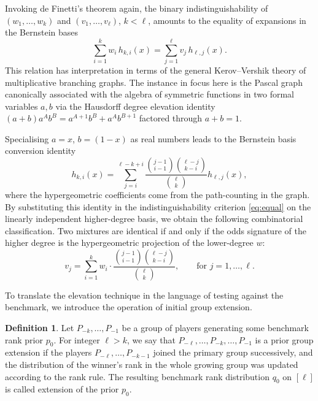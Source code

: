 \documentclass[11pt,reqno]{amsart}
\theoremstyle{definition}
\newtheorem{definition}[theorem]{Definition}
\theoremstyle{remark}
\numberwithin{equation}{section}
\begin{document}
Invoking de Finetti's theorem again, the binary indistinguishability of \((w_1,\dots,w_k)\) and \((v_1,\dots,v_\ell)\), \(k<\ell\), amounts to the equality of expansions in the Bernstein bases
\begin{equation}\label{eq:equal}
\sum_{i=1}^k w_i\,h_{k,i}(x)=\sum_{j=1}^\ell v_j\,h_{\ell,j}(x).
\end{equation}
This relation has interpretation in terms of the general Kerov--Vershik theory of multiplicative branching graphs. The instance \cite{VershikKerov1987} in focus here is the Pascal graph canonically associated with the algebra of symmetric functions in two formal variables \(a,b\) via the Hausdorff degree elevation identity \((a+b)a^Ab^B=a^{A+1}b^B+a^Ab^{B+1}\) factored through \(a+b=1\).

Specialising \(a=x\), \(b=(1-x)\) as real numbers leads to the Bernstein basis conversion identity
\begin{equation}\label{eq:Bernstein}
h_{k,i}(x)=\sum_{j=i}^{\ell-k+i}\frac{\binom{j-1}{i-1}\binom{\ell-j}{k-i}}{\binom{\ell}{k}}h_{\ell,j}(x),
\end{equation}
where the hypergeometric coefficients come from the path-counting in the graph. By substituting this identity in the indistinguishability criterion \eqref{eq:equal} on the linearly independent higher-degree basis, we obtain the following combinatorial classification. Two mixtures are identical if and only if the odds signature of the higher degree is the hypergeometric projection of the lower-degree \(w\):
\begin{equation}\label{eq:vj}
v_j=\sum_{i=1}^k w_i\cdot\frac{\binom{j-1}{i-1}\binom{\ell-j}{k-i}}{\binom{\ell}{k}},\qquad\text{for }j=1,\dots,\ell.
\end{equation}

To translate the elevation technique in the language of testing against the benchmark, we introduce the operation of initial group extension.

\begin{definition}
Let \(P_{-k},\dots,P_{-1}\) be a group of players generating some benchmark rank prior \(p_0\). For integer \(\ell>k\), we say that \(P_{-\ell},\dots,P_{-k},\dots,P_{-1}\) is a prior group extension if the players \(P_{-\ell},\dots,P_{-k-1}\) joined the primary group successively, and the distribution of the winner's rank in the whole growing group was updated according to the rank rule. The resulting benchmark rank distribution \(q_0\) on \([\ell]\) is called extension of the prior \(p_0\).
\end{definition}
\end{document}
